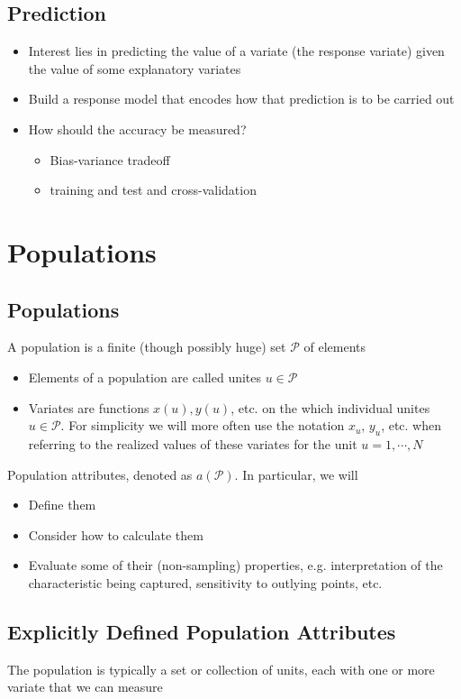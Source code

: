 \documentclass[11pt]{article}
\begin{document}
\subsection{Prediction}
\begin{itemize}
    \item Interest lies in predicting the value of a variate (the response variate) given the value of some explanatory variates 
    \item Build a response model that encodes how that prediction is to be carried out 
    \item How should the accuracy be measured?
    \begin{itemize}
        \item Bias-variance tradeoff 
        \item training and test and cross-validation 
    \end{itemize}
\end{itemize}
\newpage 

\section{Populations}
\subsection{Populations}
A population is a finite (though possibly huge) set $\mathcal{P}$ of elements
\begin{itemize}
    \item Elements of a population are called unites $u\in\mathcal{P}$
    \item Variates are functions $x(u), y(u)$, etc. on the which individual unites $u\in\mathcal{P}$. For simplicity we will more often use the notation $x_u$, $y_u$, etc. when referring to the realized values of these variates for the unit $u=1,\cdots,N$ 
\end{itemize}
Population attributes, denoted as $a(\mathcal{P})$. In particular, we will 
\begin{itemize}
    \item Define them 
    \item Consider how to calculate them 
    \item Evaluate some of their (non-sampling) properties, e.g. interpretation of the characteristic being captured, sensitivity to outlying points, etc. 
\end{itemize}
\subsection{Explicitly Defined Population Attributes}
The population is typically a set or collection of units, each with one or more variate that we can measure 
\end{document}
